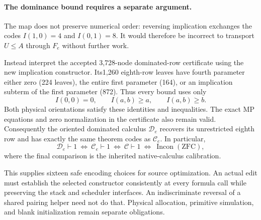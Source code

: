 \paragraph{The dominance bound requires a separate argument.}
The map does not preserve numerical order: reversing implication exchanges
the codes $I(1,0)=4$ and $I(0,1)=8$.  It would therefore be incorrect to
transport $U\le A$ through $F_e$ without further work.

Instead interpret the accepted 3,728-node dominated-row certificate using
the new implication constructor.  Its1,260 eighth-row leaves have fourth
parameter either zero (224 leaves), the entire first parameter (164), or
an implication subterm of the first parameter (872).  Thus every bound
uses only
\[
 I(0,0)=0,\qquad I(a,b)\ge a,\qquad I(a,b)\ge b.
\]
Both physical orientations satisfy these identities and inequalities.
The exact MP equations and zero normalization in the certificate also
remain valid.  Consequently the oriented dominated calculus
$\mathcal D_e$ recovers its unrestricted eighth row and has exactly the
same theorem codes as $\mathcal C_e$.  In particular,
\[
 \mathcal D_e\vdash1
 \ \Longleftrightarrow\ 
 \mathcal C_e\vdash1
 \ \Longleftrightarrow\ 
 \mathcal C\vdash1
 \ \Longleftrightarrow\ 
 \operatorname{Incon}(\mathrm{ZFC}),
\]
where the final comparison is the inherited native-calculus calibration.

This supplies sixteen safe encoding choices for source optimization.
An actual edit must establish the selected constructor consistently at
every formula call while preserving the stack and scheduler interfaces.
An indiscriminate reversal of a shared pairing helper need not do that.
Physical allocation, primitive simulation, and blank initialization
remain separate obligations.
